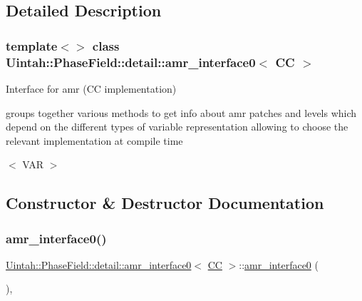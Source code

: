\subsection{Detailed Description}
\subsubsection*{template$<$$>$\newline
class Uintah\+::\+Phase\+Field\+::detail\+::amr\+\_\+interface0$<$ C\+C $>$}

Interface for amr (CC implementation) 

groups together various methods to get info about amr patches and levels which depend on the different types of variable representation allowing to choose the relevant implementation at compile time

$<$ V\+AR $>$ 

\subsection{Constructor \& Destructor Documentation}
\mbox{\label{classUintah_1_1PhaseField_1_1detail_1_1amr__interface0_3_01CC_01_4_a54940842b4b34735b6181a3e66efd7c4}} 
\subsubsection{\texorpdfstring{amr\+\_\+interface0()}{amr\_interface0()}\hspace{0.1cm}{\footnotesize\ttfamily [1/2]}}
{\footnotesize\ttfamily \hyperlink{classUintah_1_1PhaseField_1_1detail_1_1amr__interface0}{Uintah\+::\+Phase\+Field\+::detail\+::amr\+\_\+interface0}$<$ \hyperlink{namespaceUintah_1_1PhaseField_a33d355affda78a83f45755ba8388cedda22303704507d024d1d6508ed9859a85a}{CC} $>$\+::\hyperlink{classUintah_1_1PhaseField_1_1detail_1_1amr__interface0}{amr\+\_\+interface0} (\begin{DoxyParamCaption}{ }\end{DoxyParamCaption})\hspace{0.3cm}{\ttfamily [protected]}, {\ttfamily [delete]}}



